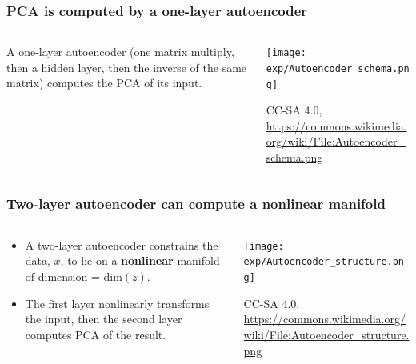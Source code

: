 \documentclass{beamer}
\begin{document}
\begin{frame}
  \frametitle{PCA is computed by a one-layer autoencoder}
  \begin{columns}
    \begin{column}{0.5\textwidth}
      A one-layer autoencoder (one matrix multiply, then a hidden
      layer, then the inverse of the same matrix) computes the PCA of
      its input.
    \end{column}
    \begin{column}{0.5\textwidth}
      \begin{center}
        \texttt{[image: exp/Autoencoder\_schema.png]}

        \begin{tiny}
          CC-SA 4.0, \url{https://commons.wikimedia.org/wiki/File:Autoencoder_schema.png}
        \end{tiny}
      \end{center}
    \end{column}
  \end{columns}
\end{frame}
  
        
\begin{frame}
  \frametitle{Two-layer autoencoder can compute a nonlinear manifold}
  \begin{columns}
    \begin{column}{0.5\textwidth}
      \begin{itemize}
      \item A two-layer autoencoder constrains the data, $x$, to lie
        on a {\bf nonlinear} manifold of dimension = $\text{dim}(z)$.
      \item The first layer nonlinearly transforms the input, then the
        second layer computes PCA of the result.
      \end{itemize}
    \end{column}
    \begin{column}{0.5\textwidth}
      \begin{center}
        \texttt{[image: exp/Autoencoder\_structure.png]}

        \begin{tiny}
          CC-SA 4.0, \url{https://commons.wikimedia.org/wiki/File:Autoencoder_structure.png}
        \end{tiny}
      \end{center}
    \end{column}
  \end{columns}
\end{frame}
\end{document}
